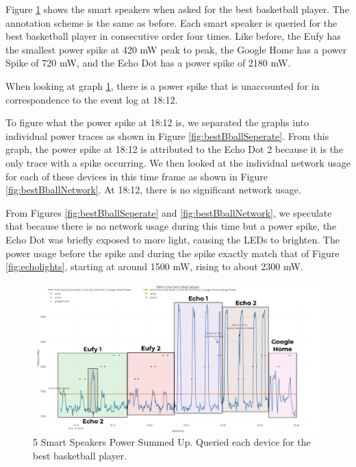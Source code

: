Figure \ref{fig:bestBballSum} shows the smart speakers when asked for the best basketball player. The annotation scheme is the same as before. Each smart speaker is queried for the best basketball player in consecutive order four times. Like before, the Eufy has the smallest power spike at 420 mW peak to peak, the Google Home has a power Spike of 720 mW, and the Echo Dot has a power spike of 2180 mW.

When looking at graph \ref{fig:bestBballSum}, there is a power spike that is unaccounted for in correspondence to the event log at 18:12.

To figure what the power spike at 18:12 is, we separated the graphs into individual power traces as shown in Figure \ref{fig:bestBballSeperate}. From this graph, the power spike at 18:12 is attributed to the Echo Dot 2 because it is the only trace with a spike occurring. We then looked at the individual network usage for each of these devices in this time frame as shown in Figure \ref{fig:bestBballNetwork}. At 18:12, there is no significant network usage.

From Figures \ref{fig:bestBballSeperate} and \ref{fig:bestBballNetwork}, we speculate that because there is no network usage during this time but a power spike, the Echo Dot was briefly exposed to more light, causing the LEDs to brighten. The power usage before the spike and during the spike exactly match that of Figure \ref{fig:echolights}, starting at around 1500 mW, rising to about 2300 mW.

\begin{figure}[H]
  \centering
  \includegraphics[width=1\textwidth]{figures/bestBballSum.png}
  \caption{5 Smart Speakers Power Summed Up. Queried each device for the
  best basketball player.}
  \label{fig:bestBballSum}
\end{figure}

